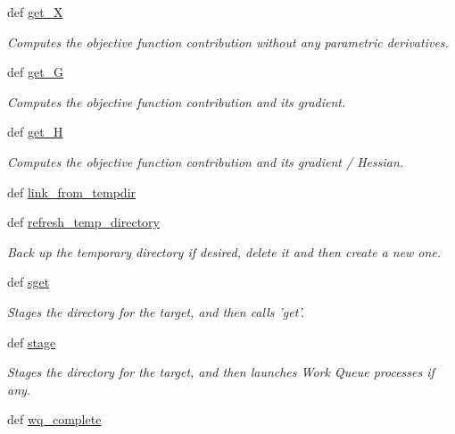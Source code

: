 \begin{DoxyCompactItemize}
def \hyperlink{classforcebalance_1_1target_1_1Target_a606dd136f195c267c05a2455405e5949}{get\-\_\-\-X}
\begin{DoxyCompactList}\small\item\em Computes the objective function contribution without any parametric derivatives. \end{DoxyCompactList}\item 
def \hyperlink{classforcebalance_1_1target_1_1Target_afa8cc38c8bba8861c072e789717aa049}{get\-\_\-\-G}
\begin{DoxyCompactList}\small\item\em Computes the objective function contribution and its gradient. \end{DoxyCompactList}\item 
def \hyperlink{classforcebalance_1_1target_1_1Target_a1d2ee27fe86a09769c1816af23b09adb}{get\-\_\-\-H}
\begin{DoxyCompactList}\small\item\em Computes the objective function contribution and its gradient / Hessian. \end{DoxyCompactList}\item 
def \hyperlink{classforcebalance_1_1target_1_1Target_a5aa4958cea0a48138511567a076c5a82}{link\-\_\-from\-\_\-tempdir}
\item 
def \hyperlink{classforcebalance_1_1target_1_1Target_afe815eafab06ac92f10bbf4b88ad95c8}{refresh\-\_\-temp\-\_\-directory}
\begin{DoxyCompactList}\small\item\em Back up the temporary directory if desired, delete it and then create a new one. \end{DoxyCompactList}\item 
def \hyperlink{classforcebalance_1_1target_1_1Target_a51d58b55242bf4d4909c1837174f5f3c}{sget}
\begin{DoxyCompactList}\small\item\em Stages the directory for the target, and then calls 'get'. \end{DoxyCompactList}\item 
def \hyperlink{classforcebalance_1_1target_1_1Target_af8d2a4658c87841e40296795aec478bb}{stage}
\begin{DoxyCompactList}\small\item\em Stages the directory for the target, and then launches Work Queue processes if any. \end{DoxyCompactList}\item 
def \hyperlink{classforcebalance_1_1target_1_1Target_af6099ec09486213869dba2491bd8ea04}{wq\-\_\-complete}

\end{DoxyCompactItemize}
